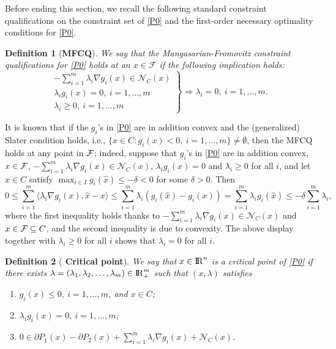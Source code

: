 \documentclass[10pt]{article}
\numberwithin{equation}{section}
\newtheorem{definition}{Definition}[section]
\def\R{{\rm I\!R}}
\begin{document}
Before ending this section, we recall the following standard constraint qualifications on the constraint set of \eqref{P0} and the first-order necessary optimality conditions for \eqref{P0}.
\begin{definition}[{{\bf MFCQ}}]\label{MFCQ1}
We say that the Mangasarian-Fromovitz constraint qualifications for \eqref{P0} holds at an $x\in \mathcal{F}$ if the following implication holds:
\[
\left.\begin{matrix}
-\sum\limits_{i=1}^m\lambda_i \nabla g_i(x)\in \mathcal{N}_C(x)\\
\lambda_ig_i(x) =0, ~ i = 1, \ldots, m\\
\lambda_i\geq 0, ~ i = 1, \ldots, m
\end{matrix}\right\} \Rightarrow\lambda_i =0, ~ i = 1,\ldots, m.
\]
\end{definition}
{\color{blue} It is known that if the $g_i$'s in \eqref{P0} are in addition convex and the (generalized) Slater condition holds, i.e., $\{x \in C: g_i(x) < 0, ~ i = 1, \ldots, m\} \neq \emptyset $, then the MFCQ holds at any point in ${\cal F}$; indeed, suppose that $g_i$'s in \eqref{P0} are in addition convex, $x\in {\cal F}$, $-\sum\limits_{i=1}^m\lambda_i \nabla g_i(x)\in \mathcal{N}_C(x)$, $\lambda_ig_i(x) =0$ and
$\lambda_i\geq 0$ for all $i$, and let $\hat x\in C$ satisfy $\max_{i\in I}g_i(\hat x) \le -\delta < 0$ for some $\delta > 0$. Then
\[
0 \le \sum_{i=1}^m\langle \lambda_i \nabla g_i(x), \hat x - x\rangle\le \sum_{i=1}^m\lambda_i(g_i(\hat x) - g_i(x)) = \sum_{i=1}^m\lambda_ig_i(\hat x)\le -\delta\sum_{i=1}^m\lambda_i,
\]
where the first inequality holds thanks to $-\sum\limits_{i=1}^m\lambda_i \nabla g_i(x)\in \mathcal{N}_C(x)$ and $x\in {\cal F}\subseteq C$, and the second inequality is due to convexity.
The above display together with $\lambda_i \ge 0$ for all $i$ shows that $\lambda_i = 0$ for all $i$.
}
\begin{definition}[{{\bf {\color{blue} Critical point}}}]\label{Stationary}
We say that $x\in\R^n$ is a {\color{blue}critical point} of \eqref{P0} if there exists $\lambda = (\lambda_1, \lambda_2, \ldots, \lambda_m)\in\R_+^m$ such that $(x,\lambda)$ satisfies
 \begin{enumerate}[{\rm (i)}]
   \item $g_i(x) \leq 0, ~ i = 1, \ldots, m$, and $x\in C$;
   \item $\lambda_ig_i(x)=0, ~ i = 1, \ldots, m$;
   \item $0\in\partial P_1(x) - \partial P_2(x) + \sum\limits_{i=1}^m\lambda_i \nabla g_i(x) + \mathcal{N}_C(x)$.
 \end{enumerate}
\end{definition}
\end{document}

